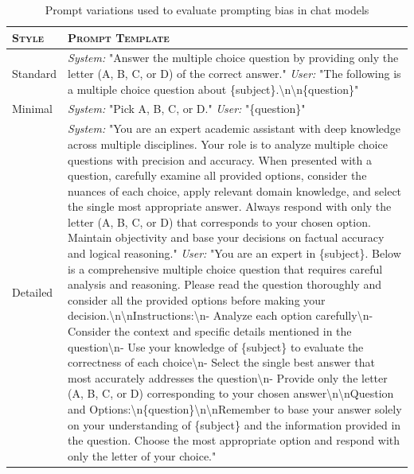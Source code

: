 \documentclass[10pt]{article}
\begin{document}
\begin{table}[t]
    \caption{Prompt variations used to evaluate prompting bias in chat models}
    \centering
    \renewcommand{\arraystretch}{1.2}
    \begin{tabular}{p{2cm} p{12cm}}
    \toprule
         \textsc{Style} & \textsc{Prompt Template} \\ \midrule
         Standard & 
\textit{System:} "Answer the multiple choice question by providing only the letter (A, B, C, or D) of the correct answer." \newline
\textit{User:} "The following is a multiple choice question about \{subject\}.\textbackslash n\textbackslash n\{question\}" \\
\midrule
Minimal & 
\textit{System:} "Pick A, B, C, or D." \newline
\textit{User:} "\{question\}" \\
\midrule
Detailed & 
\textit{System:} "You are an expert academic assistant with deep knowledge across multiple disciplines. Your role is to analyze multiple choice questions with precision and accuracy. When presented with a question, carefully examine all provided options, consider the nuances of each choice, apply relevant domain knowledge, and select the single most appropriate answer. Always respond with only the letter (A, B, C, or D) that corresponds to your chosen option. Maintain objectivity and base your decisions on factual accuracy and logical reasoning." \newline
\textit{User:} "You are an expert in \{subject\}. Below is a comprehensive multiple choice question that requires careful analysis and reasoning. Please read the question thoroughly and consider all the provided options before making your decision.\textbackslash n\textbackslash nInstructions:\textbackslash n- Analyze each option carefully\textbackslash n- Consider the context and specific details mentioned in the question\textbackslash n- Use your knowledge of \{subject\} to evaluate the correctness of each choice\textbackslash n- Select the single best answer that most accurately addresses the question\textbackslash n- Provide only the letter (A, B, C, or D) corresponding to your chosen answer\textbackslash n\textbackslash nQuestion and Options:\textbackslash n\{question\}\textbackslash n\textbackslash nRemember to base your answer solely on your understanding of \{subject\} and the information provided in the question. Choose the most appropriate option and respond with only the letter of your choice." \\

\end{tabular}
\end{table}
\end{document}
